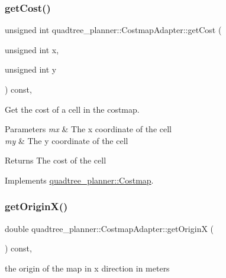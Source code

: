 \subsubsection{\texorpdfstring{get\+Cost()}{getCost()}}
{\footnotesize\ttfamily unsigned int quadtree\+\_\+planner\+::\+Costmap\+Adapter\+::get\+Cost (\begin{DoxyParamCaption}\item[{unsigned int}]{x,  }\item[{unsigned int}]{y }\end{DoxyParamCaption}) const\hspace{0.3cm}{\ttfamily [override]}, {\ttfamily [virtual]}}



Get the cost of a cell in the costmap. 


\begin{DoxyParams}{Parameters}
{\em mx} & The x coordinate of the cell \\
\hline
{\em my} & The y coordinate of the cell \\
\hline
\end{DoxyParams}
\begin{DoxyReturn}{Returns}
The cost of the cell 
\end{DoxyReturn}


Implements \hyperlink{classquadtree__planner_1_1Costmap_ada8d9915ad1b73637730fe65be8d291d}{quadtree\+\_\+planner\+::\+Costmap}.

\mbox{\label{classquadtree__planner_1_1CostmapAdapter_ad63fb92c24234eb69b7672a7c9f15d26}} 
\subsubsection{\texorpdfstring{get\+Origin\+X()}{getOriginX()}}
{\footnotesize\ttfamily double quadtree\+\_\+planner\+::\+Costmap\+Adapter\+::get\+OriginX (\begin{DoxyParamCaption}{ }\end{DoxyParamCaption}) const\hspace{0.3cm}{\ttfamily [override]}, {\ttfamily [virtual]}}



the origin of the map in x direction in meters 

